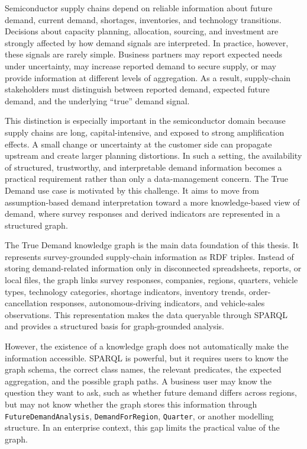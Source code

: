 \documentclass[
  12pt,
  english,
  oneside]{report}
\begin{document}
Semiconductor supply chains depend on reliable information about future demand, current demand, shortages, inventories, and technology transitions. Decisions about capacity planning, allocation, sourcing, and investment are strongly affected by how demand signals are interpreted. In practice, however, these signals are rarely simple. Business partners may report expected needs under uncertainty, may increase reported demand to secure supply, or may provide information at different levels of aggregation. As a result, supply-chain stakeholders must distinguish between reported demand, expected future demand, and the underlying ``true'' demand signal.

This distinction is especially important in the semiconductor domain because supply chains are long, capital-intensive, and exposed to strong amplification effects. A small change or uncertainty at the customer side can propagate upstream and create larger planning distortions. In such a setting, the availability of structured, trustworthy, and interpretable demand information becomes a practical requirement rather than only a data-management concern. The True Demand use case is motivated by this challenge. It aims to move from assumption-based demand interpretation toward a more knowledge-based view of demand, where survey responses and derived indicators are represented in a structured graph.

The True Demand knowledge graph is the main data foundation of this thesis. It represents survey-grounded supply-chain information as RDF triples. Instead of storing demand-related information only in disconnected spreadsheets, reports, or local files, the graph links survey responses, companies, regions, quarters, vehicle types, technology categories, shortage indicators, inventory trends, order-cancellation responses, autonomous-driving indicators, and vehicle-sales observations. This representation makes the data queryable through SPARQL and provides a structured basis for graph-grounded analysis.

However, the existence of a knowledge graph does not automatically make the information accessible. SPARQL is powerful, but it requires users to know the graph schema, the correct class names, the relevant predicates, the expected aggregation, and the possible graph paths. A business user may know the question they want to ask, such as whether future demand differs across regions, but may not know whether the graph stores this information through \texttt{FutureDemandAnalysis}, \texttt{DemandForRegion}, \texttt{Quarter}, or another modelling structure. In an enterprise context, this gap limits the practical value of the graph.
\end{document}
